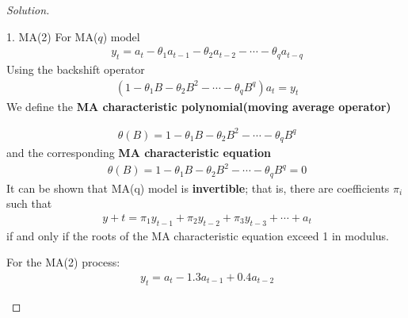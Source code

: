 \documentclass[UTF8,a4paper,14pt]{ctexart}
\newenvironment{solution}
  {\renewcommand\qedsymbol{$\blacksquare$}\begin{proof}[Solution]}
  {\end{proof}}
\theoremstyle{definition}
\theoremstyle{remark}
\begin{document}
\begin{solution}\,

  \begin{mybox}{1. MA(2)}
    For MA(\(q\)) model
    \begin{equation}\
      \begin{aligned}
        y_t = a_t -\theta_1 a_{t-1} -\theta_2 a_{t-2}-\cdots-\theta_{q}a_{t-q}
      \end{aligned}
    \end{equation}
    Using the backshift operator
    \begin{equation}\
      \begin{aligned}
        (1-\theta_1 B -\theta_2 B^2 -\cdots-\theta_{q}B^{q}) a_t = y_t 
      \end{aligned}
    \end{equation}  
    We define the \textbf{MA characteristic polynomial(moving average operator)}

    \begin{equation}\
      \begin{aligned}
       \theta(B) = 1-\theta_1 B -\theta_2 B^2 -\cdots-\theta_{q}B^{q}
      \end{aligned}
    \end{equation}
    and the corresponding \textbf{MA characteristic equation}
    \begin{equation}\
      \begin{aligned}
       \theta(B) = 1-\theta_1 B -\theta_2 B^2 -\cdots-\theta_{q}B^{q} = 0
      \end{aligned}
    \end{equation}
    It can be shown that MA(q) model is \textbf{invertible}; that is, there are coefficients \(\pi_i\) such that
    \begin{equation}\
      \begin{aligned}
       y+t = \pi_1 y_{t-1} +\pi_2 y_{t-2} +\pi_3y_{t-3}+\cdots+a_t
      \end{aligned}
    \end{equation}
    if and only if the roots of the MA characteristic equation exceed 1 in modulus.




    \tcblower
    For the MA(2) process:
    \begin{equation}\
      \begin{aligned}
        y_{t} = a_{t} - 1.3 a_{t-1} + 0.4 a_{t-2}
      \end{aligned}
    \end{equation}


\end{mybox}
\end{solution}
\end{document}
